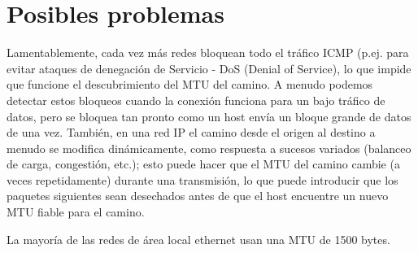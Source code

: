 \documentclass[a4paper,12pt]{article}
\begin{document}
\section{Posibles problemas}
Lamentablemente, cada vez más redes bloquean todo el tráfico ICMP (p.ej. para evitar ataques de denegación de Servicio - DoS (Denial of Service), lo que impide que funcione el descubrimiento del MTU del camino. A menudo podemos detectar estos bloqueos cuando la conexión funciona para un bajo tráfico de datos, pero se bloquea tan pronto como un host envía un bloque grande de datos de una vez. También, en una red IP el camino desde el origen al destino a menudo se modifica dinámicamente, como respuesta a sucesos variados (balanceo de carga, congestión, etc.); esto puede hacer que el MTU del camino cambie (a veces repetidamente) durante una transmisión, lo que puede introducir que los paquetes siguientes sean desechados antes de que el host encuentre un nuevo MTU fiable para el camino.

La mayoría de las redes de área local ethernet usan una MTU de 1500 bytes.
\end{document}
